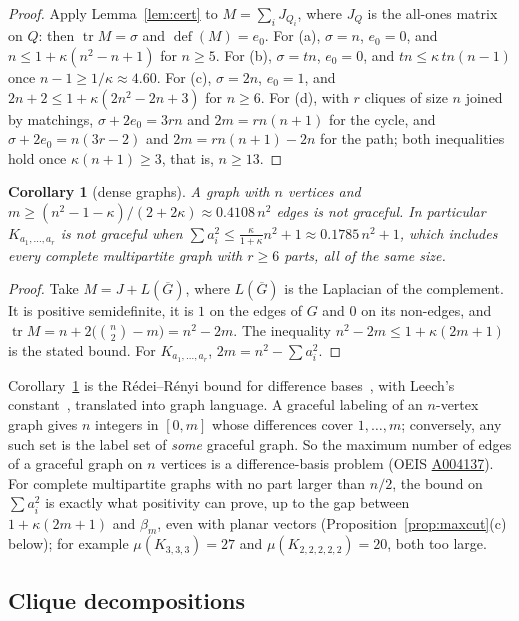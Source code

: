 \documentclass[11pt]{amsart}
\theoremstyle{tplain}
\newtheorem{corollary}[theorem]{Corollary}
\theoremstyle{tdefinition}
\theoremstyle{tremark}
\newcommand{\tr}{\operatorname{tr}}
\begin{document}
\begin{proof}
Apply Lemma~\ref{lem:cert} to $M=\sum_iJ_{Q_i}$, where $J_Q$ is the all-ones
matrix on $Q$: then $\tr M=\sigma$ and $\operatorname{def}(M)=e_0$. For (a), $\sigma=n$,
$e_0=0$, and $n\le1+\kappa(n^2-n+1)$ for $n\ge5$. For (b), $\sigma=tn$, $e_0=0$,
and $tn\le\kappa\,tn(n-1)$ once $n-1\ge1/\kappa\approx4.60$. For (c),
$\sigma=2n$, $e_0=1$, and $2n+2\le1+\kappa(2n^2-2n+3)$ for $n\ge6$. For (d),
with $r$ cliques of size $n$ joined by matchings, $\sigma+2e_0=3rn$ and
$2m=rn(n+1)$ for the cycle, and $\sigma+2e_0=n(3r-2)$ and $2m=rn(n+1)-2n$ for
the path; both inequalities hold once $\kappa(n+1)\ge3$, that is, $n\ge13$.
\end{proof}

\begin{corollary}[dense graphs]\label{cor:dense}
A graph with $n$ vertices and
$m\ge(n^2-1-\kappa)/(2+2\kappa)\approx0.4108\,n^2$ edges is not graceful. In
particular $K_{a_1,\dots,a_r}$ is not graceful when
$\sum a_i^2\le{\frac{\kappa}{1+\kappa}n^2+1}\approx{0.1785\,n^2+1}$, which
includes every complete multipartite graph with $r\ge6$ parts, all of the
same size.
\end{corollary}

\begin{proof}
Take $M=J+L(\overline G)$, where $L(\overline G)$ is the Laplacian of the
complement. It is positive semidefinite, it is $1$ on the edges of $G$ and
$0$ on its non-edges, and $\tr M=n+2\bigl(\binom n2-m\bigr)=n^2-2m$. The
inequality $n^2-2m\le1+\kappa(2m+1)$ is the stated bound. For
$K_{a_1,\dots,a_r}$, $2m=n^2-\sum a_i^2$.
\end{proof}

Corollary~\ref{cor:dense} is the R\'edei--R\'enyi bound for difference
bases~\cite{rr}, with Leech's constant~\cite{leech}, translated into graph
language. A graceful labeling of an $n$-vertex graph gives $n$ integers in
$[0,m]$ whose differences cover $1,\dots,m$; conversely, any such set is the
label set of \emph{some} graceful graph. So the maximum number of edges of a
graceful graph on $n$ vertices is a difference-basis problem (OEIS \href{https://oeis.org/A004137}{A004137}).
For complete multipartite graphs with no part larger than $n/2$, the bound on
$\sum a_i^2$ is exactly what positivity can prove, up to the gap between
$1+\kappa(2m+1)$ and $\beta_m$, even with planar vectors
(Proposition~\ref{prop:maxcut}(c) below); for example $\mu(K_{3,3,3})=27$ and
$\mu(K_{2,2,2,2,2})=20$, both too large.

\subsection{Clique decompositions}
\end{document}
